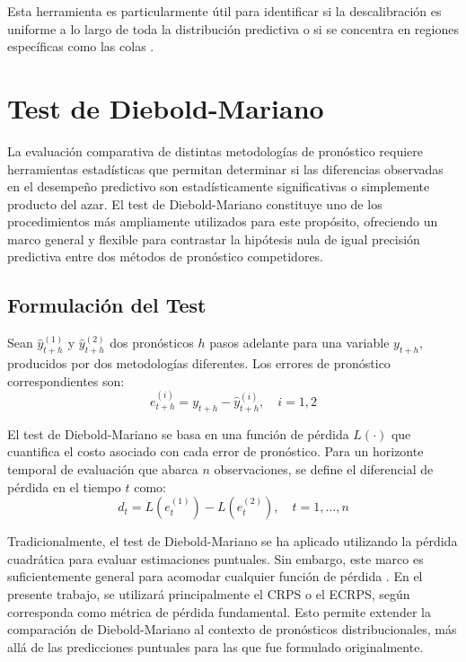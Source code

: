 Esta herramienta es particularmente útil para identificar si la descalibración es uniforme a lo largo de toda la distribución predictiva o si se concentra en regiones específicas como las colas \parencite{Thorarinsdottir2017}.


\section{Test de Diebold-Mariano}
\label{sec:test_diebold_mariano}

La evaluación comparativa de distintas metodologías de pronóstico requiere herramientas estadísticas que permitan determinar si las diferencias observadas en el desempeño predictivo son estadísticamente significativas o simplemente producto del azar. El test de Diebold-Mariano \parencite{DieboldMariano1995} constituye uno de los procedimientos más ampliamente utilizados para este propósito, ofreciendo un marco general y flexible para contrastar la hipótesis nula de igual precisión predictiva entre dos métodos de pronóstico competidores.

\subsection{Formulación del Test}

Sean $\hat{y}_{t+h}^{(1)}$ y $\hat{y}_{t+h}^{(2)}$ dos pronósticos $h$ pasos adelante para una variable $y_{t+h}$, producidos por dos metodologías diferentes. Los errores de pronóstico correspondientes son:
\begin{equation}
e_{t+h}^{(i)} = y_{t+h} - \hat{y}_{t+h}^{(i)}, \quad i = 1, 2
\end{equation}

El test de Diebold-Mariano se basa en una función de pérdida $L(\cdot)$ que cuantifica el costo asociado con cada error de pronóstico. Para un horizonte temporal de evaluación que abarca $n$ observaciones, se define el diferencial de pérdida en el tiempo $t$ como:
\begin{equation}
d_t = L(e_t^{(1)}) - L(e_t^{(2)}), \quad t = 1, \ldots, n
\label{eq:loss_differential}
\end{equation}

Tradicionalmente, el test de Diebold-Mariano se ha aplicado utilizando la pérdida cuadrática para evaluar estimaciones puntuales. Sin embargo, este marco es suficientemente general para acomodar cualquier función de pérdida \parencite{DieboldMariano1995}. En el presente trabajo, se utilizará principalmente el CRPS o el ECRPS, según corresponda como métrica de pérdida fundamental. Esto permite extender la comparación de Diebold-Mariano al contexto de pronósticos distribucionales, más allá de las predicciones puntuales para las que fue formulado originalmente.

